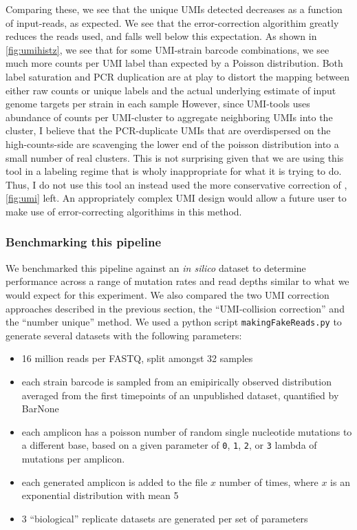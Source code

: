 Comparing these, we see that the unique UMIs detected decreases as a
function of input-reads, as expected. 
We see that the error-correction algorithim greatly reduces the reads
used, and falls well below this expectation. As shown in
\autoref{fig:umihistz}, we see that for some UMI-strain barcode
combinations, we see much more counts per UMI label than expected by a
Poisson distribution. 
Both label saturation and PCR duplication
are at play to distort the mapping between either raw counts or unique
labels and the actual underlying estimate of input genome targets per
strain in each sample
However, since UMI-tools uses abundance of counts per UMI-cluster
to aggregate neighboring UMIs into the cluster, I believe that the
PCR-duplicate UMIs that are overdispersed on the high-counts-side
are scavenging the lower end of the poisson distribution 
into a small number of real clusters. This is not
surprising given that we are using this tool in a labeling regime that
is wholy inappropriate for what it is trying to do. 
Thus, I do not use
this tool an instead used the more conservative 
correction of \cite{fu2011counting}, \autoref{fig:umi} left.
An appropriately complex UMI design would allow a future user to make
use of error-correcting algorithims in this method.

\subsubsection{Benchmarking this pipeline}

We benchmarked this pipeline against an \emph{in silico} dataset to
determine performance across a range of mutation rates and read depths
similar to what we would expect for this experiment. We also compared
the two UMI correction approaches described in the previous section, the
``UMI-collision correction'' and the ``number unique'' method. We used a
python script \texttt{makingFakeReads.py} to generate several datasets
with the following parameters:

\begin{itemize}
  \setlength\itemsep{0em}
  \item
  16 million reads per FASTQ, split amongst 32 samples
  \item
  each strain barcode is sampled from an emipirically observed
  distribution averaged from the first timepoints of an unpublished
  dataset, quantified by BarNone
  \item
  each amplicon has a poisson number of random single nucleotide
  mutations to a different base, based on a given parameter of
  \texttt{0}, \texttt{1}, \texttt{2}, or \texttt{3} lambda of mutations
  per amplicon.
  \item
  each generated amplicon is added to the file \(x\) number of times,
  where \(x\) is an exponential distribution with mean 5
  \item
  3 ``biological'' replicate datasets are generated per set of
  parameters
\end{itemize}

